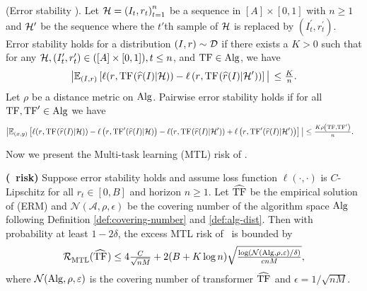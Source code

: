 \begin{assumption}
\label{assm:stability-assumption}
(Error stability \citep{bousquet2002stability, li2023transformers}). Let $\mathcal{H}=\left(I_t, r_t\right)_{t=1}^n$ be a sequence in $[A] \times [0,1]$ with $n \geq 1$ and $\mathcal{H}^{\prime}$ be the sequence where the $t'$th sample of $\mathcal{H}$ is replaced by $\left(I_t^{\prime}, r_t^{\prime}\right)$. Error stability holds for a distribution $(I, r)\sim\mathcal{D}$ if there exists a $K>0$ such that for any $\mathcal{H},\left(I_t^{\prime}, r_t^{\prime}\right) \in([A] \times [0,1]), t \leq n$, and $\mathrm{TF} \in \mathrm{Alg}$, we have
\begin{align*}
\big\lvert \mathbb{E}_{(I, r)}\left[\ell(r_{},\mathrm{TF}_{}(\widehat{r}_{}(I_{})|\mathcal{H}))-\ell\left(r_{},\mathrm{TF}_{}(\widehat{r}_{}(I_{})|\mathcal{H}^\prime)\right)\right] \big\rvert\, \leq \tfrac{K}{n}.
\end{align*}
Let $\rho$ be a distance metric on $\mathrm{Alg}$. Pairwise error stability holds if for all $\mathrm{TF}, \mathrm{TF}^{\prime} \in \mathrm{Alg}$ we have
\begin{align*}
\begin{aligned}
& \big\lvert \mathbb{E}_{(x, y)}\left[\ell(r_{},\mathrm{TF}_{}(\widehat{r}_{}(I_{})|\mathcal{H}))-\ell\left(r_{},\mathrm{TF}'_{}(\widehat{r}_{}(I_{})|\mathcal{H})\right)-\ell(r_{},\mathrm{TF}_{}(\widehat{r}_{}(I_{})|\mathcal{H}'))+\ell\left(r_{},\mathrm{TF}'_{}(\widehat{r}_{}(I_{})|\mathcal{H}')\right)\right] \big\rvert \leq \tfrac{K \rho\left(\mathrm{TF}, \mathrm{TF}^{\prime}\right)}{n}.
\end{aligned}
\end{align*}
\end{assumption}
Now we present the Multi-task learning (MTL) risk of \predt.  
\begin{theorem}
\label{thm:multi-task-risk}\textbf{(\pred\ risk)}
    Suppose error stability  holds and assume loss function $\ell(\cdot,\cdot)$ is $C$-Lipschitz for all $r_t \in [0,B]$ and horizon $n\geq 1$. Let $\widehat{\mathrm{TF}}$ be the empirical solution of (ERM) and $\mathcal{N}(\mathcal{A}, \rho, \epsilon)$ be the covering number of the algorithm space $\mathrm{Alg}$ following Definition \ref{def:covering-number} and \ref{def:alg-dist}. Then with probability at least $1-2 \delta$, the excess MTL risk of \predt\ is bounded by
    \begin{align*} %
        \cR^{}_{\mathrm{MTL}}(\widehat{\T}_{}) \leq 4 \tfrac{C}{\sqrt{nM}} +2(B+K \log n) \sqrt{\tfrac{\log (\N(\alg, \rho, \varepsilon) / \delta)}{c n M}},
    \end{align*}
    where $\mathcal{N}(\mathrm{Alg}, \rho, \varepsilon)$ is the covering number of transformer $\widehat{\mathrm{TF}}_{}$ and $\epsilon = 1/\sqrt{nM}$. 
\end{theorem}
